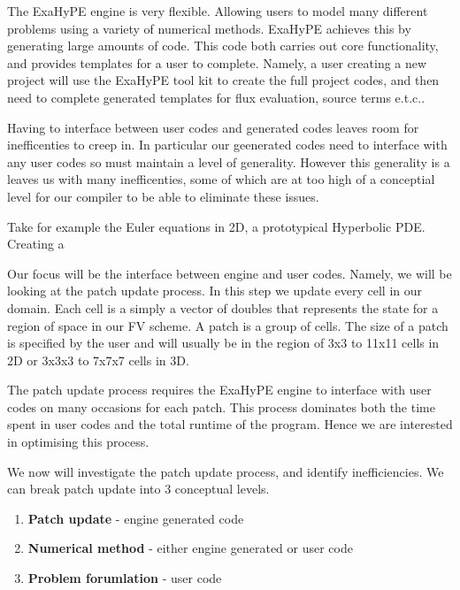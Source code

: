 The ExaHyPE engine is very flexible.
Allowing users to model many different problems using a variety of numerical methods.
ExaHyPE achieves this by generating large amounts of code.
This code both carries out core functionality, and provides templates for a user to complete.
Namely, a user creating a new project will use the ExaHyPE tool kit to create the full project codes, and then need to complete generated templates for flux evaluation, source terms e.t.c..

Having to interface between user codes and generated codes leaves room for inefficenties to creep in. 
In particular our geenerated codes need to interface with any user codes so must maintain a level of generality.
However this generality is a leaves us with many inefficenties, some of which are at too high of a conceptial level for our compiler to be able to eliminate these issues.

Take for example the Euler equations in 2D, a prototypical Hyperbolic PDE.
Creating a  



Our focus will be the interface between engine and user codes.
Namely, we will be looking at the patch update process.
In this step we update every cell in our domain.
Each cell is a simply a vector of doubles that represents the state for a region of space in our FV scheme. 
A patch is a group of cells.
The size of a patch is specified by the user and will usually be in the region of 3x3 to 11x11 cells in 2D or 3x3x3 to 7x7x7 cells in 3D. %

The patch update process requires the ExaHyPE engine to interface with user codes on many occasions for each patch.
This process dominates both the time spent in user codes and the total runtime of the program.
Hence we are interested in optimising this process. 


\newcommand{\func}[1]{\textbf{#1}}
\newcommand{\var}[1]{\textbf{#1}}

We now will investigate the patch update process, and identify inefficiencies.
We can break patch update into 3 conceptual levels.
\begin{enumerate}
    \item \func{Patch update} - engine generated code
    \item  \func{Numerical method} - either engine generated or user code
    \item \func{Problem forumlation} - user code
\end{enumerate}

